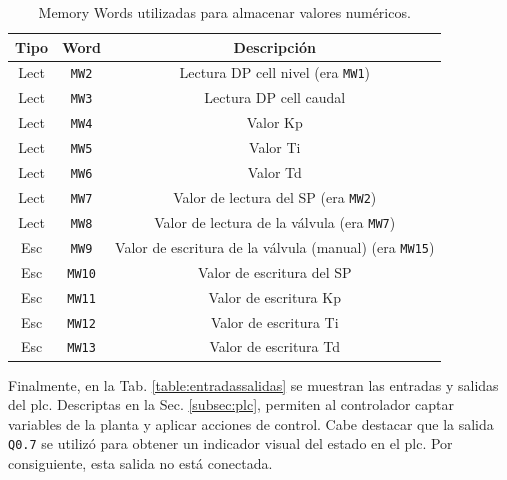\begin{table}[!t]

\renewcommand{\arraystretch}{1.3}
\centering
\begin{tabular}{c||c||c}
\hline
\bfseries Tipo & \bfseries Word  & \bfseries Descripción\\
\hline \hline
Lect & \verb|MW2|  & Lectura DP cell nivel (era \verb|MW1|)\\
Lect & \verb|MW3|  & Lectura DP cell caudal\\
Lect & \verb|MW4|  & Valor Kp\\
Lect & \verb|MW5|  & Valor Ti\\
Lect & \verb|MW6|  & Valor Td\\
Lect & \verb|MW7|  & Valor de lectura del SP (era \verb|MW2|)\\
Lect & \verb|MW8|  & Valor de lectura de la válvula (era \verb|MW7|)\\
\hline
Esc & \verb|MW9| & Valor de escritura de la válvula (manual) (era 
\verb|MW15|) \\
Esc & \verb|MW10|  & Valor de escritura del SP \\
Esc & \verb|MW11|  & Valor de escritura Kp \\
Esc & \verb|MW12|  & Valor de escritura Ti \\
Esc & \verb|MW13| & Valor de escritura Td \\
\hline
\end{tabular}
\caption{Memory Words utilizadas para almacenar valores numéricos.}
\label{table:mwNumericos}
\end{table}

Finalmente, en la Tab. \ref{table:entradassalidas} se muestran las entradas y
salidas del \gls{plc}.
Descriptas en la Sec. \ref{subsec:plc}, permiten al
controlador captar variables de la planta y aplicar acciones de control.
Cabe destacar que la salida \verb|Q0.7| se utilizó para obtener un indicador
visual del estado en el \gls{plc}.
Por consiguiente, esta salida no está conectada.

